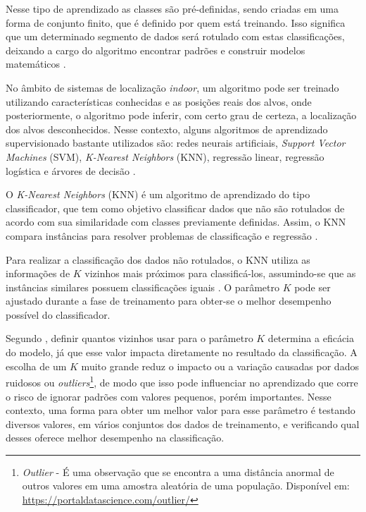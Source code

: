 \documentclass[12pt]{artigoifce}
\begin{document}
Nesse tipo de aprendizado as classes são pré-definidas, sendo criadas em uma forma de conjunto finito, que é definido por quem está treinando. Isso significa que um determinado segmento de dados será rotulado com estas classificações, deixando a cargo do algoritmo encontrar padrões e construir modelos matemáticos \cite{nasteski2017}.

No âmbito de sistemas de localização \textit{indoor}, um algoritmo pode ser treinado utilizando características conhecidas e as posições reais dos alvos, onde posteriormente, o algoritmo pode inferir, com certo grau de certeza, a localização dos alvos desconhecidos. Nesse contexto, alguns algoritmos de aprendizado supervisionado bastante utilizados são: redes neurais artificiais, \textit{Support Vector Machines} (SVM), \textit{K-Nearest Neighbors} (KNN), regressão linear, regressão logística e árvores de decisão \cite{berz2015}.

\label{sec-fundamentacao-knn}

O \textit{K-Nearest Neighbors} (KNN) é um algoritmo de aprendizado do tipo classificador, que tem como objetivo classificar dados que não são rotulados de acordo com sua similaridade com classes previamente definidas. Assim, o KNN compara instâncias para resolver problemas de classificação e regressão \cite{oliveira2021}.

Para realizar a classificação dos dados não rotulados, o KNN utiliza as informações de $K$ vizinhos mais próximos para classificá-los, assumindo-se que as instâncias similares possuem classificações iguais \cite{tatsch2019}. O parâmetro $K$ pode ser ajustado durante a fase de treinamento para obter-se o melhor desempenho possível do classificador.

Segundo , definir quantos vizinhos usar para o parâmetro $K$ determina a eficácia do modelo, já que esse valor impacta diretamente no resultado da classificação. A escolha de um $K$ muito grande reduz o impacto ou a variação causadas por dados ruidosos ou \textit{outliers}\footnote{ \textit{Outlier} - É uma observação que se encontra a uma distância anormal de outros valores em uma amostra aleatória de uma população. Disponível em: \url{https://portaldatascience.com/outlier/}}, de modo que isso pode influenciar no aprendizado que corre o risco de ignorar padrões com valores pequenos, porém importantes. Nesse contexto, uma forma para obter um melhor valor para esse parâmetro é testando diversos valores, em vários conjuntos dos dados de treinamento, e verificando qual desses oferece melhor desempenho na classificação.
\end{document}
